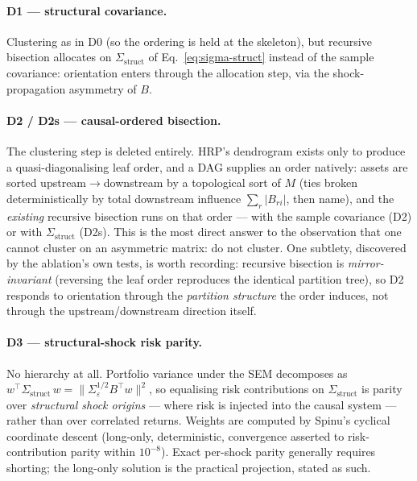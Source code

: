 \paragraph{D1 --- structural covariance.} Clustering as in D0 (so the
ordering is held at the skeleton), but recursive bisection allocates on
$\Sigma_{\mathrm{struct}}$ of Eq.~\eqref{eq:sigma-struct} instead of the
sample covariance: orientation enters through the allocation step, via the
shock-propagation asymmetry of $B$.

\paragraph{D2 / D2s --- causal-ordered bisection.}
\label{sec:d2}
The clustering step is deleted entirely. HRP's dendrogram exists only to
produce a quasi-diagonalising leaf order, and a DAG supplies an order
natively: assets are sorted upstream$\to$downstream by a topological sort of
$M$ (ties broken deterministically by total downstream influence
$\sum_r |B_{ri}|$, then name), and the \emph{existing} recursive bisection
runs on that order --- with the sample covariance (D2) or with
$\Sigma_{\mathrm{struct}}$ (D2s). This is the most direct answer to the
observation that one cannot cluster on an asymmetric matrix: do not cluster.
One subtlety, discovered by the ablation's own tests, is worth recording:
recursive bisection is \emph{mirror-invariant} (reversing the leaf order
reproduces the identical partition tree), so D2 responds to orientation
through the \emph{partition structure} the order induces, not through the
upstream/downstream direction itself.

\paragraph{D3 --- structural-shock risk parity.} No hierarchy at all.
Portfolio variance under the SEM decomposes as
$w^\top \Sigma_{\mathrm{struct}}\, w =
\lVert \Sigma_\varepsilon^{1/2} B^\top w \rVert^2$, so equalising risk
contributions on $\Sigma_{\mathrm{struct}}$ is parity over \emph{structural
shock origins} --- where risk is injected into the causal system --- rather
than over correlated returns. Weights are computed by Spinu's cyclical
coordinate descent \cite{spinu2013erc} (long-only, deterministic,
convergence asserted to risk-contribution parity within $10^{-8}$). Exact
per-shock parity generally requires shorting; the long-only solution is the
practical projection, stated as such.

